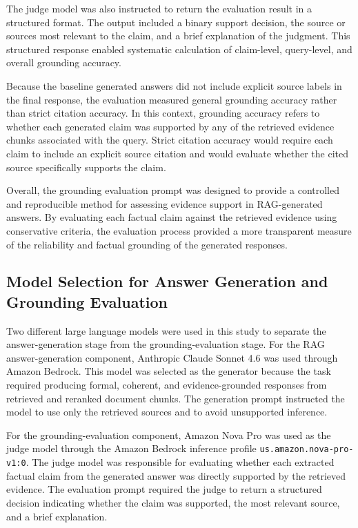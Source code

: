 The judge model was also instructed to return the evaluation result in a structured format. The output included a binary support decision, the source or sources most relevant to the claim, and a brief explanation of the judgment. This structured response enabled systematic calculation of claim-level, query-level, and overall grounding accuracy.

Because the baseline generated answers did not include explicit source labels in the final response, the evaluation measured general grounding accuracy rather than strict citation accuracy. In this context, grounding accuracy refers to whether each generated claim was supported by any of the retrieved evidence chunks associated with the query. Strict citation accuracy would require each claim to include an explicit source citation and would evaluate whether the cited source specifically supports the claim.

Overall, the grounding evaluation prompt was designed to provide a controlled and reproducible method for assessing evidence support in RAG-generated answers. By evaluating each factual claim against the retrieved evidence using conservative criteria, the evaluation process provided a more transparent measure of the reliability and factual grounding of the generated responses.

\subsection{Model Selection for Answer Generation and Grounding Evaluation}
\label{subsec:model_selection_generation_evaluation}

Two different large language models were used in this study to separate the answer-generation stage from the grounding-evaluation stage. For the RAG answer-generation component, Anthropic Claude Sonnet 4.6 was used through Amazon Bedrock. This model was selected as the generator because the task required producing formal, coherent, and evidence-grounded responses from retrieved and reranked document chunks. The generation prompt instructed the model to use only the retrieved sources and to avoid unsupported inference.

For the grounding-evaluation component, Amazon Nova Pro was used as the judge model through the Amazon Bedrock inference profile \texttt{us.amazon.nova-pro-v1:0}. The judge model was responsible for evaluating whether each extracted factual claim from the generated answer was directly supported by the retrieved evidence. The evaluation prompt required the judge to return a structured decision indicating whether the claim was supported, the most relevant source, and a brief explanation.


